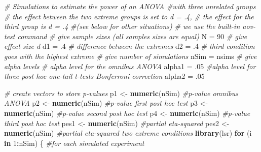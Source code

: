 \documentclass[]{book}
\newenvironment{Shaded}{\begin{snugshade}}{\end{snugshade}}
\newcommand{\CommentTok}[1]{\textcolor[rgb]{0.56,0.35,0.01}{\textit{#1}}}
\newcommand{\ControlFlowTok}[1]{\textcolor[rgb]{0.13,0.29,0.53}{\textbf{#1}}}
\newcommand{\DecValTok}[1]{\textcolor[rgb]{0.00,0.00,0.81}{#1}}
\newcommand{\FloatTok}[1]{\textcolor[rgb]{0.00,0.00,0.81}{#1}}
\newcommand{\KeywordTok}[1]{\textcolor[rgb]{0.13,0.29,0.53}{\textbf{#1}}}
\newcommand{\NormalTok}[1]{#1}
\newcommand{\OperatorTok}[1]{\textcolor[rgb]{0.81,0.36,0.00}{\textbf{#1}}}
\newcommand{\StringTok}[1]{\textcolor[rgb]{0.31,0.60,0.02}{#1}}
\begin{document}
\begin{Shaded}
\begin{Highlighting}[]
\CommentTok{# Simulations to estimate the power of an ANOVA }
\CommentTok{#with three unrelated groups}
\CommentTok{# the effect between the two extreme groups is set to d = .4, }
\CommentTok{# the effect for the third group is d = .4 }
\CommentTok{#(see below for other situations)}
\CommentTok{# we use the built-in aov-test command}
\CommentTok{# give sample sizes (all samples sizes are equal)}
\NormalTok{N =}\StringTok{ }\DecValTok{90}
\CommentTok{# give effect size d}
\NormalTok{d1 =}\StringTok{ }\FloatTok{.4} \CommentTok{# difference between the extremes}
\NormalTok{d2 =}\StringTok{ }\FloatTok{.4} \CommentTok{# third condition goes with the highest extreme}
\CommentTok{# give number of simulations}
\NormalTok{nSim =}\StringTok{ }\NormalTok{nsims}
\CommentTok{# give alpha levels}
\CommentTok{# alpha level for the omnibus ANOVA}
\NormalTok{alpha1 =}\StringTok{ }\FloatTok{.05} 
\CommentTok{#alpha level for three post hoc one-tail t-tests Bonferroni correction}
\NormalTok{alpha2 =}\StringTok{ }\FloatTok{.05} 

\CommentTok{# create vectors to store p-values}
\NormalTok{p1 <-}\StringTok{ }\KeywordTok{numeric}\NormalTok{(nSim) }\CommentTok{#p-value omnibus ANOVA}
\NormalTok{p2 <-}\StringTok{ }\KeywordTok{numeric}\NormalTok{(nSim) }\CommentTok{#p-value first post hoc test}
\NormalTok{p3 <-}\StringTok{ }\KeywordTok{numeric}\NormalTok{(nSim) }\CommentTok{#p-value second post hoc test}
\NormalTok{p4 <-}\StringTok{ }\KeywordTok{numeric}\NormalTok{(nSim) }\CommentTok{#p-value third post hoc test}
\NormalTok{pes1 <-}\StringTok{ }\KeywordTok{numeric}\NormalTok{(nSim) }\CommentTok{#partial eta-squared}
\NormalTok{pes2 <-}\StringTok{ }\KeywordTok{numeric}\NormalTok{(nSim) }\CommentTok{#partial eta-squared two extreme conditions}
\KeywordTok{library}\NormalTok{(lsr)}
\ControlFlowTok{for}\NormalTok{ (i }\ControlFlowTok{in} \DecValTok{1}\OperatorTok{:}\NormalTok{nSim) \{}
\CommentTok{#for each simulated experiment}


\end{Highlighting}
\end{Shaded}
\end{document}

